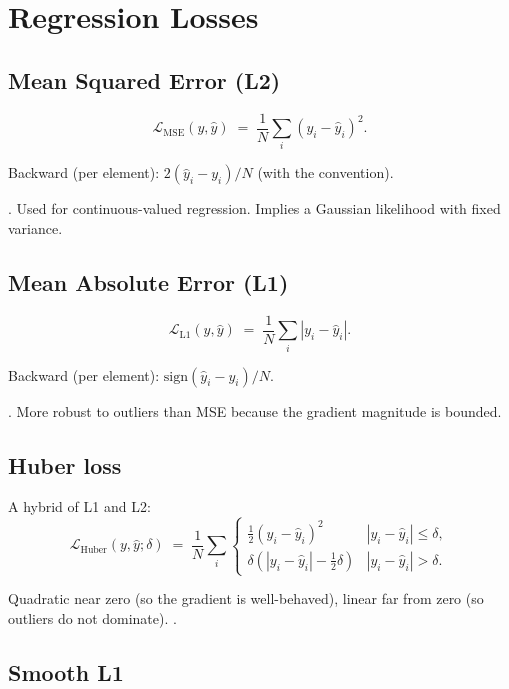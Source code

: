 \section{Regression Losses}
\label{sec:losses:regression}

\subsection{Mean Squared Error (L2)}
\label{ssec:losses:mse}

\[
\mathcal{L}_{\text{MSE}}(y, \hat y) \;=\; \frac{1}{N} \sum_i (y_i - \hat y_i)^2.
\]

Backward (per element): $2(\hat y_i - y_i)/N$ (with the
 convention).

. Used for continuous-valued
regression. Implies a Gaussian likelihood with fixed variance.

\subsection{Mean Absolute Error (L1)}
\label{ssec:losses:l1}

\[
\mathcal{L}_{\text{L1}}(y, \hat y) \;=\; \frac{1}{N} \sum_i |y_i - \hat y_i|.
\]

Backward (per element): $\mathrm{sign}(\hat y_i - y_i) / N$.

. More robust to outliers than MSE because the
gradient magnitude is bounded.

\subsection{Huber loss}
\label{ssec:losses:huber}

A hybrid of L1 and L2:
\[
\mathcal{L}_{\text{Huber}}(y, \hat y; \delta) \;=\; \frac{1}{N} \sum_i
\begin{cases}
\tfrac{1}{2}(y_i - \hat y_i)^2 & |y_i - \hat y_i| \leq \delta, \\
\delta(|y_i - \hat y_i| - \tfrac{1}{2}\delta) & |y_i - \hat y_i| > \delta.
\end{cases}
\]

Quadratic near zero (so the gradient is well-behaved), linear far
from zero (so outliers do not dominate). .

\subsection{Smooth L1}
\label{ssec:losses:smooth_l1}

